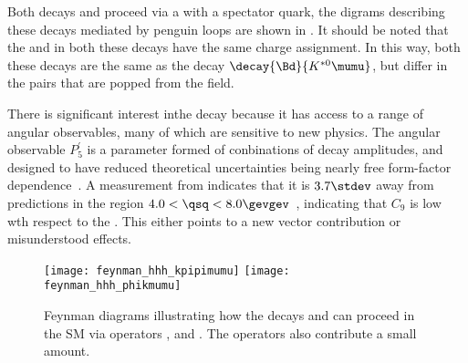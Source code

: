 
Both decays \btokpipimumu and \btophikmumu proceed via a \decay{\bquark}{\squark\mumu} \fcnc with a
spectator \uquark quark, the digrams describing these decays mediated by penguin loops are shown in
.
It should be noted that the \Bp and \Kp in both these decays have the same charge assignment.
In this way, both these decays are the same as the \fcnc decay $\decay{\Bd}{K^{*0}\mumu}$, but
differ in the \qqbar pairs that are popped from the \QCD field.

There is significant interest inthe decay \btokstrmumu because it has access to a range of angular
observables, many of which are sensitive to new physics.
The angular observable $P_5^\prime$ is a parameter formed of conbinations of \Kstarz decay
amplitudes, and designed to have reduced theoretical uncertainties being nearly free form-factor
dependence~\cite{LHCb-PAPER-2013-037}.
A measurement from \lhcb indicates that it is $3.7\stdev$ away from
predictions in the region $4.0<\qsq<8.0\gevgev$~\cite{LHCb-CONF-2015-002},
indicating that $C_9$ is low~\cite{Altmannshofer:2014rta} wth respect to the \sm.
This either points to a new vector contribution or misunderstood \QCD effects.



\begin{figure}
  \begin{center}
    \texttt{[image: feynman\_hhh\_kpipimumu]}
    \texttt{[image: feynman\_hhh\_phikmumu]}
    \caption[Feynman diagrams for \btokpipimumu and \btophikmumu]
    {
      Feynman diagrams illustrating how the decays \btokpipimumu and \btophikmumu can proceed in
      the SM via operators ,  and .
      The operators  also contribute a small amount.
    }
    \label{fig:hhh:feyn}
  \end{center}
\end{figure}

